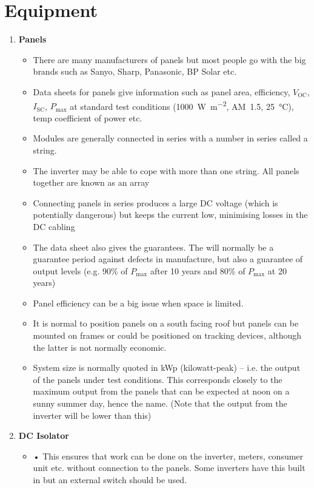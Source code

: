 \documentclass{article}
\begin{document}
\section{Equipment}
\begin{enumerate}
\item \textbf{Panels}
\begin{itemize}
\item	There are many manufacturers of panels but most people go with the big brands such as Sanyo, Sharp, Panasonic, BP Solar etc. 
\item	Data sheets for panels give information such as panel area, efficiency, $V_\text{OC}$, $I_\text{SC}$, $P_\text{max}$ at standard test conditions (\SI{1000}{\watt\per\metre\squared}, \SI{1.5}[AM]{}, \SI{25}{\celsius}), temp coefficient of power etc.
\item	Modules are generally connected in series with a number in series called a string. 
\item	The inverter may be able to cope with more than one string. All panels together are known as an array
\item	Connecting panels in series produces a large DC voltage (which is potentially dangerous) but keeps the current low, minimising losses in the DC cabling
\item	The data sheet also gives the guarantees. The will normally be a guarantee period against defects in manufacture, but also a guarantee of output levels (e.g. 90\% of $P_\text{max}$ after 10 years and 80\% of $P_\text{max}$ at 20 years) 
\item	Panel efficiency can be a big issue when space is limited.
\item	It is normal to position panels on a south facing roof but panels can be mounted on frames or could be positioned on tracking devices, although the latter is not normally economic.
\item	System size is normally quoted in kWp (kilowatt-peak) – i.e. the output of the panels under test conditions. This corresponds closely to the maximum output from the panels that can be expected at noon on a sunny summer day, hence the name. (Note that the output from the inverter will be lower than this)
\end{itemize}
\item \textbf{DC Isolator}
\begin{itemize}
\item •	This ensures that work can be done on the inverter, meters, consumer unit etc. without connection to the panels. Some inverters have this built in but an external switch should be used.

\end{itemize}
\end{enumerate}
\end{document}
